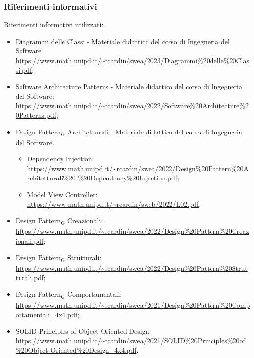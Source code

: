 \subsubsection{Riferimenti informativi}
Riferimenti informativi utilizzati:
\begin{itemize}
	\item Diagrammi delle Classi - Materiale didattico del corso di Ingegneria del Software: \\
		\url{https://www.math.unipd.it/~rcardin/swea/2023/Diagrammi\%20delle\%20Classi.pdf};
	\item Software Architecture Patterns - Materiale didattico del corso di Ingegneria del Software: \\
		\url{https://www.math.unipd.it/~rcardin/swea/2022/Software\%20Architecture\%20Patterns.pdf};
	\item Design Pattern\textsubscript{G} Architetturali - Materiale didattico del corso di Ingegneria del Software. 
	\begin{itemize}
		\item Dependency Injection: 
		\url{https://www.math.unipd.it/~rcardin/swea/2022/Design\%20Pattern\%20Architetturali\%20-\%20Dependency\%20Injection.pdf};
		\item Model View Controller:
		\url{https://www.math.unipd.it/~rcardin/sweb/2022/L02.pdf}.
	\end{itemize}
	\item Design Pattern\textsubscript{G} Creazionali:\\
		\url{https://www.math.unipd.it/~rcardin/swea/2022/Design\%20Pattern\%20Creazionali.pdf};
	\item Design Pattern\textsubscript{G} Strutturali:\\
		\url{https://www.math.unipd.it/~rcardin/swea/2022/Design\%20Pattern\%20Strutturali.pdf};
	\item Design Pattern\textsubscript{G} Comportamentali:\\
		\url{https://www.math.unipd.it/~rcardin/swea/2021/Design\%20Pattern\%20Comportamentali_4x4.pdf};
	\item SOLID Principles of Object-Oriented Design:\\
		\url{https://www.math.unipd.it/~rcardin/swea/2021/SOLID\%20Principles\%20of\%20Object-Oriented\%20Design_4x4.pdf}.
\end{itemize}

